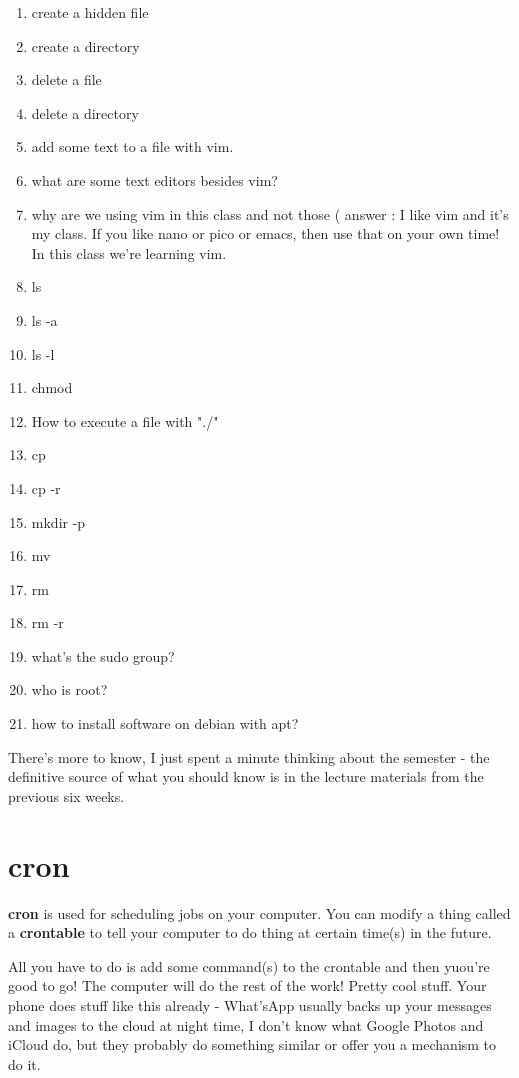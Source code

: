 \documentclass[12pt,a4paper]{article}
\begin{document}
\begin{multicols}{2}
\begin{enumerate}
\setlength\itemsep{0em}
\item create a hidden file
\item create a directory
\item delete a file
\item delete a directory
\item add some text to a file with vim.
\item what are some text editors besides vim?
\item why are we using vim in this class and not those ( answer : I like vim and
it's my class. If you like nano or pico or emacs, then use that on your own
time! In this class we're learning vim.
\item ls
\item ls -a
\item ls -l
\item chmod
\item How to execute a file with "./"
\item cp
\item cp -r
\item mkdir -p
\item mv
\item rm 
\item rm -r
\item what's the sudo group?
\item who is root?
\item how to install software on debian with apt?
\end{enumerate}
\end{multicols}
There's more to know, I just spent a minute thinking about the semester - the
definitive source of what you should know is in the lecture materials from the
previous six weeks.

\section{cron}
\textbf{cron} is used for scheduling jobs on your computer. You can modify a
thing called a \textbf{crontable} to tell your computer to do thing at certain time(s) in the future.

All you have to do is add some command(s) to the crontable and then yuou're good
to go! The computer will do the rest of the work! Pretty cool stuff. Your phone
does stuff like this already - What'sApp usually backs up your messages and
images to the cloud at night time, I don't know what Google Photos and iCloud
do, but they probably do something similar or offer you a mechanism to do  it.
\end{document}
